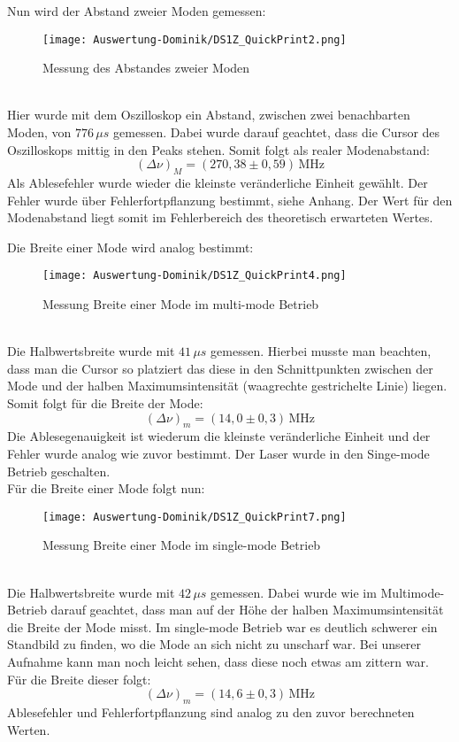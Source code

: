 Nun wird der Abstand zweier Moden gemessen:
\begin{figure}[h]
    \centering\texttt{[image: Auswertung-Dominik/DS1Z\_QuickPrint2.png]}
    \caption{Messung des Abstandes zweier Moden}
\end{figure}\\
Hier wurde mit dem Oszilloskop ein Abstand, zwischen zwei benachbarten Moden, von $776\,\mu s$ gemessen.
Dabei wurde darauf geachtet, dass die Cursor des Oszilloskops mittig in den Peaks stehen.
Somit folgt als realer Modenabstand:
\begin{equation}
    \left(\Delta\nu\right)_M=\left(270,38\pm0,59\right)\,\text{MHz}
\end{equation}
Als Ablesefehler wurde wieder die kleinste veränderliche Einheit gewählt.
Der Fehler wurde über Fehlerfortpflanzung bestimmt, siehe Anhang.
Der Wert für den Modenabstand liegt somit im Fehlerbereich des theoretisch erwarteten Wertes.\newpage

Die Breite einer Mode wird analog bestimmt:
\begin{figure}[h]
    \centering\texttt{[image: Auswertung-Dominik/DS1Z\_QuickPrint4.png]}
    \caption{Messung Breite einer Mode im multi-mode Betrieb}
\end{figure}\\
Die Halbwertsbreite wurde mit $41\,\mu s$ gemessen. Hierbei musste man beachten, dass man die Cursor so platziert das diese in den Schnittpunkten zwischen der Mode und der halben Maximumsintensität (waagrechte gestrichelte Linie) liegen.\\
Somit folgt für die Breite der Mode:
\begin{equation}
    \left(\Delta\nu\right)_m=\left(14,0\pm0,3\right)\,\text{MHz}
\end{equation}
Die Ablesegenauigkeit ist wiederum die kleinste veränderliche Einheit und der Fehler wurde analog wie zuvor bestimmt.\newpage
Der Laser wurde in den Singe-mode Betrieb geschalten.\\
Für die Breite einer Mode folgt nun:
\begin{figure}[h]
    \centering\texttt{[image: Auswertung-Dominik/DS1Z\_QuickPrint7.png]}
    \caption{Messung Breite einer Mode im single-mode Betrieb}    
\end{figure}\\
Die Halbwertsbreite wurde mit $42\,\mu s$ gemessen.
Dabei wurde wie im Multimode-Betrieb darauf geachtet, dass man auf der Höhe der halben Maximumsintensität die Breite der Mode misst.
Im single-mode Betrieb war es deutlich schwerer ein Standbild zu finden, wo die Mode an sich nicht zu unscharf war.
Bei unserer Aufnahme kann man noch leicht sehen, dass diese noch etwas am zittern war.\\
Für die Breite dieser folgt:
\begin{equation}
    \left(\Delta\nu\right)_m=\left(14,6\pm0,3\right)\,\text{MHz}
\end{equation}
Ablesefehler und Fehlerfortpflanzung sind analog zu den zuvor berechneten Werten.\newpage
